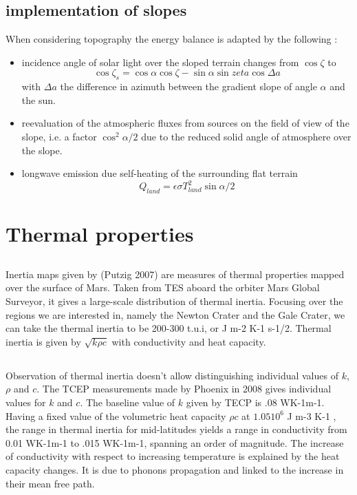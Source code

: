 \documentclass{report}
\begin{document}
    \subsection{implementation of slopes}
    When considering topography the energy balance is adapted by the following :
    \begin{itemize}
        \item incidence angle of solar light over the sloped terrain changes from $\cos{\zeta} $ to $$\cos{ \zeta_s} = \cos{ \alpha} \cos{ \zeta} - \sin{ \alpha} \sin{zeta}\cos{\Delta a}$$
        with $\Delta a$ the difference in azimuth between the gradient slope of angle $\alpha$ and the sun. 
        \item reevaluation of the atmospheric fluxes from sources on the field of view of the slope, i.e. a factor $\cos^2{\alpha/2}$ due to the reduced solid angle of atmosphere over the slope.  
        \item longwave emission due self-heating of the surrounding flat terrain 
       \[Q_{land} = \epsilon \sigma T_{land}^2\sin{\alpha/2}\]
    \end{itemize}{}

\section{Thermal properties}
    \subsection{}
    Inertia maps given by (Putzig 2007) are measures of thermal properties mapped over the surface of Mars. Taken from TES aboard the orbiter Mars Global Surveyor, it gives a large-scale distribution of thermal inertia. 
    Focusing over the regions we are interested in, namely the Newton Crater and the Gale Crater, we can take the thermal inertia to be 200-300 t.u.i, or J m-2 K-1 s-1/2. 
    Thermal inertia is given by $\sqrt{k\rho c}$ with conductivity and heat capacity. 
    \subsection{}
    Observation of thermal inertia doesn't allow distinguishing individual values of $k$, $\rho$ and $c$. The TCEP measurements made by Phoenix in 2008 gives individual values for $k$ and $c$. 
    The baseline value of $k$ given by TECP is .08 WK-1m-1. 
    Having a fixed value of the volumetric heat capacity $\rho c$ at $1.05 10^6$ J m-3 K-1 , the range in thermal inertia for mid-latitudes yields a range in conductivity from 0.01 WK-1m-1 to .015 WK-1m-1, spanning an order of magnitude.
    The increase of conductivity with respect to increasing temperature is explained by the heat capacity changes. It is due to phonons propagation and linked to the increase in their mean free path. 
    
\end{document}
